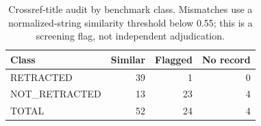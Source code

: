 \begin{table}[t]
\centering\footnotesize
\caption{Crossref-title audit by benchmark class. Mismatches use a normalized-string similarity threshold below 0.55; this is a screening flag, not independent adjudication.}
\label{tab:titleaudit}
\begin{tabular}{lrrr}
\toprule
Class & Similar & Flagged & No record \\
\midrule
RETRACTED & 39 & 1 & 0 \\
NOT\_RETRACTED & 13 & 23 & 4 \\
TOTAL & 52 & 24 & 4 \\
\bottomrule
\end{tabular}
\end{table}